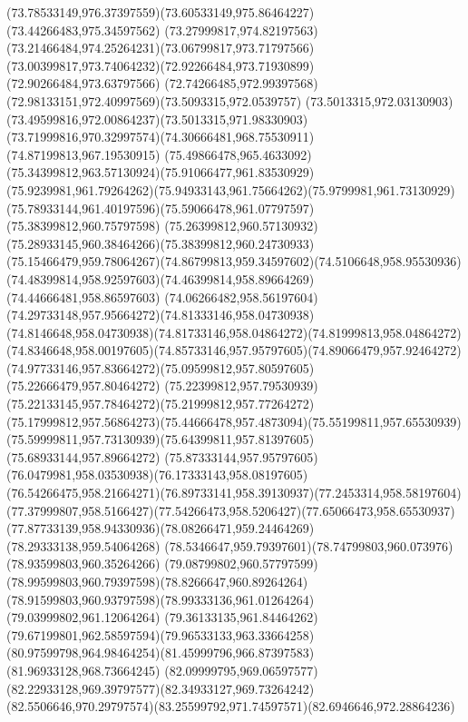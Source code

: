 {{		\curveto(73.78533149,976.37397559)(73.60533149,975.86464227)(73.44266483,975.34597562)
		\curveto(73.27999817,974.82197563)(73.21466484,974.25264231)(73.06799817,973.71797566)
		\curveto(73.00399817,973.74064232)(72.92266484,973.71930899)(72.90266484,973.63797566)
		\curveto(72.74266485,972.99397568)(72.98133151,972.40997569)(73.5093315,972.0539757)
		\curveto(73.5013315,972.03130903)(73.49599816,972.00864237)(73.5013315,971.98330903)
		\curveto(73.71999816,970.32997574)(74.30666481,968.75530911)(74.87199813,967.19530915)
		\curveto(75.49866478,965.4633092)(75.34399812,963.57130924)(75.91066477,961.83530929)
		\curveto(75.9239981,961.79264262)(75.94933143,961.75664262)(75.9799981,961.73130929)
		\curveto(75.78933144,961.40197596)(75.59066478,961.07797597)(75.38399812,960.75797598)
		\curveto(75.26399812,960.57130932)(75.28933145,960.38464266)(75.38399812,960.24730933)
		\curveto(75.15466479,959.78064267)(74.86799813,959.34597602)(74.5106648,958.95530936)
		\curveto(74.48399814,958.92597603)(74.46399814,958.89664269)(74.44666481,958.86597603)
		\curveto(74.06266482,958.56197604)(74.29733148,957.95664272)(74.81333146,958.04730938)
		\curveto(74.8146648,958.04730938)(74.81733146,958.04864272)(74.81999813,958.04864272)
		\curveto(74.8346648,958.00197605)(74.85733146,957.95797605)(74.89066479,957.92464272)
		\curveto(74.97733146,957.83664272)(75.09599812,957.80597605)(75.22666479,957.80464272)
		\curveto(75.22399812,957.79530939)(75.22133145,957.78464272)(75.21999812,957.77264272)
		\curveto(75.17999812,957.56864273)(75.44666478,957.4873094)(75.55199811,957.65530939)
		\curveto(75.59999811,957.73130939)(75.64399811,957.81397605)(75.68933144,957.89664272)
		\curveto(75.87333144,957.95797605)(76.0479981,958.03530938)(76.17333143,958.08197605)
		\curveto(76.54266475,958.21664271)(76.89733141,958.39130937)(77.2453314,958.58197604)
		\curveto(77.37999807,958.5166427)(77.54266473,958.5206427)(77.65066473,958.65530937)
		\curveto(77.87733139,958.94330936)(78.08266471,959.24464269)(78.29333138,959.54064268)
		\curveto(78.5346647,959.79397601)(78.74799803,960.073976)(78.93599803,960.35264266)
		\curveto(79.08799802,960.57797599)(78.99599803,960.79397598)(78.8266647,960.89264264)
		\curveto(78.91599803,960.93797598)(78.99333136,961.01264264)(79.03999802,961.12064264)
		\curveto(79.36133135,961.84464262)(79.67199801,962.58597594)(79.96533133,963.33664258)
		\curveto(80.97599798,964.98464254)(81.45999796,966.87397583)(81.96933128,968.73664245)
		\curveto(82.09999795,969.06597577)(82.22933128,969.39797577)(82.34933127,969.73264242)
		\curveto(82.5506646,970.29797574)(83.25599792,971.74597571)(82.6946646,972.28864236)
}}
